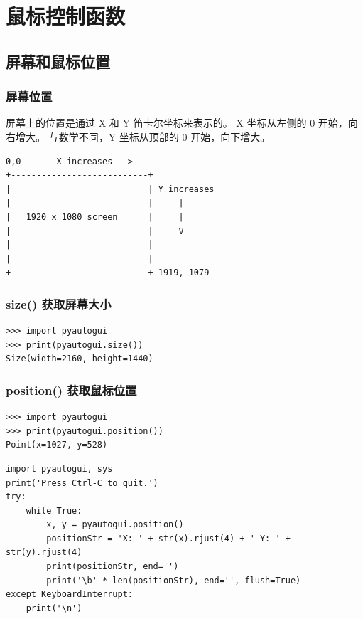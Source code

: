 \chapter{鼠标控制函数}

\section{屏幕和鼠标位置}
\subsection{屏幕位置}
屏幕上的位置是通过 X 和 Y 笛卡尔坐标来表示的。
X 坐标从左侧的 0 开始，向右增大。
与数学不同，Y 坐标从顶部的 0 开始，向下增大。
\begin{lstlisting}[style=demostyle,numbers=none]
0,0       X increases -->
+---------------------------+
|                           | Y increases
|                           |     |
|   1920 x 1080 screen      |     |
|                           |     V
|                           |
|                           |
+---------------------------+ 1919, 1079
\end{lstlisting}

\subsection{size() 获取屏幕大小}
\begin{lstlisting}[style=demostyle,numbers=none]
>>> import pyautogui
>>> print(pyautogui.size())
Size(width=2160, height=1440)
\end{lstlisting}

\subsection{position() 获取鼠标位置}
\begin{lstlisting}[style=demostyle,numbers=none]
>>> import pyautogui
>>> print(pyautogui.position())
Point(x=1027, y=528)
\end{lstlisting}

\begin{lstlisting}[style=pythonstyle, title={实时获取鼠标位置.py}]
import pyautogui, sys
print('Press Ctrl-C to quit.')
try:
    while True:
        x, y = pyautogui.position()
        positionStr = 'X: ' + str(x).rjust(4) + ' Y: ' + str(y).rjust(4)
        print(positionStr, end='')
        print('\b' * len(positionStr), end='', flush=True)
except KeyboardInterrupt:
    print('\n')
\end{lstlisting}

